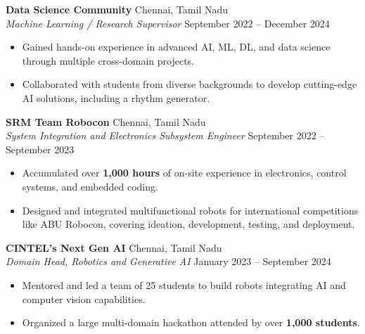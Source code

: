 \documentclass[a4paper,9pt]{extarticle}
\begin{document}
\noindent
\textbf{Data Science Community} \hfill Chennai, Tamil Nadu\\
\textit{Machine Learning / Research Supervisor} \hfill September 2022 – December 2024
\begin{itemize}
    \item Gained hands-on experience in advanced AI, ML, DL, and data science through multiple cross-domain projects.
    \item Collaborated with students from diverse backgrounds to develop cutting-edge AI solutions, including a rhythm generator.
\end{itemize}

\noindent
\textbf{SRM Team Robocon} \hfill Chennai, Tamil Nadu\\
\textit{System Integration and Electronics Subsystem Engineer} \hfill September 2022 – September 2023
\begin{itemize}
    \item Accumulated over \textbf{1,000 hours} of on-site experience in electronics, control systems, and embedded coding.
    \item Designed and integrated multifunctional robots for international competitions like ABU Robocon, covering ideation, development, testing, and deployment.
\end{itemize}

\noindent
\textbf{CINTEL's Next Gen AI} \hfill Chennai, Tamil Nadu\\
\textit{Domain Head, Robotics and Generative AI} \hfill January 2023 – September 2024
\begin{itemize}
    \item Mentored and led a team of 25 students to build robots integrating AI and computer vision capabilities.
    \item Organized a large multi-domain hackathon attended by over \textbf{1,000 students}.
\end{itemize}

\end{document}
